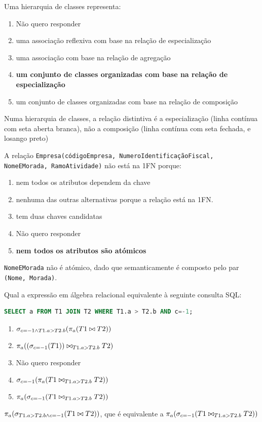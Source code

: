 \documentclass[type=recurso, year=2015/16]{bdad_exam}
\begin{document}
{
\renewcommand{\thechapter}{\arabic{chapter}R}
\setcounter{chapter}{15}
Uma hierarquia de classes representa:
\begin{enumerate}[label=\alph*.]\itemsep0em
    \item Não quero responder
    \item uma associação reflexiva com base na relação de especialização
    \item uma associação com base na relação de agregação
    \item \textbf{um conjunto de classes organizadas com base na relação de especialização \greencheckmark}
    \item um conjunto de classes organizadas com base na relação de composição
\end{enumerate}
Numa hierarquia de classes, a relação distintiva é a especialização (linha contínua com seta aberta branca), não a composição (linha contínua com seta fechada, e losango preto)

A relação \texttt{Empresa(códigoEmpresa, NumeroIdentificaçãoFiscal, NomeEMorada, RamoAtividade)} não está na 1FN porque:
\begin{enumerate}[label=\alph*.]\itemsep0em
    \item nem todos os atributos dependem da chave
    \item nenhuma das outras alternativas porque a relação está na 1FN.
    \item tem duas chaves candidatas
    \item Não quero responder
    \item \textbf{nem todos os atributos são atómicos \greencheckmark}
\end{enumerate}
\texttt{NomeEMorada} não é atómico, dado que semanticamente é composto pelo par \texttt{(Nome, Morada)}.

Qual a expressão em álgebra relacional equivalente à seguinte consulta SQL:
\begin{lstlisting}[language=SQL]
SELECT a FROM T1 JOIN T2 WHERE T1.a > T2.b AND c=-1;
\end{lstlisting}
\begin{enumerate}[label=\alph*.]\itemsep0em
    \item $\sigma_{c=-1 \wedge T1.a > T2.b}(\pi_{a}(T1 \bowtie T2))$
    \item $\pi_{a}((\sigma_{c=-1}(T1)) \bowtie_{T1.a > T2.b} T2)$
    \item Não quero responder
    \item $\sigma_{c=-1}(\pi_{a}(T1 \bowtie_{T1.a > T2.b} T2))$
    \item \textbf{$\pi_{a}(\sigma_{c=-1}(T1 \bowtie_{T1.a > T2.b} T2))$ \greencheckmark}
\end{enumerate}
$\pi_{a}(\sigma_{T1.a > T2.b \wedge c=-1}(T1 \bowtie T2))$, que é equivalente a $\pi_{a}(\sigma_{c=-1}(T1 \bowtie_{T1.a > T2.b} T2))$

}
\end{document}
